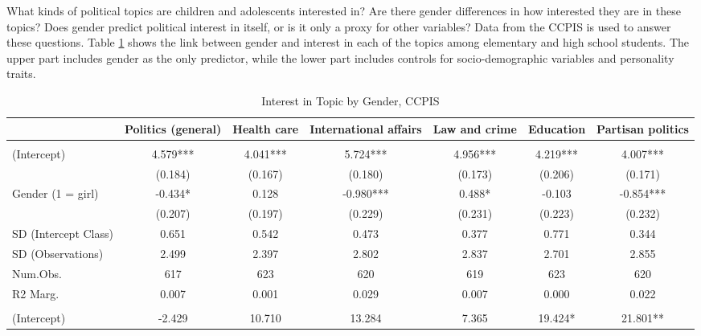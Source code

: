 \documentclass[
  letterpaper,
  DIV=11,
  numbers=noendperiod]{scrreprt}
\begin{document}
What kinds of political topics are children and adolescents interested
in? Are there gender differences in how interested they are in these
topics? Does gender predict political interest in itself, or is it only
a proxy for other variables? Data from the CCPIS is used to answer these
questions. Table \ref{tab:lmeInterestCCPIS} shows the link between
gender and interest in each of the topics among elementary and high
school students. The upper part includes gender as the only predictor,
while the lower part includes controls for socio-demographic variables
and personality traits.

\begin{table}
\centering\centering
\caption{Interest in Topic by Gender, CCPIS \label{tab:lmeInterestCCPIS}}
\centering
\fontsize{6}{8}\selectfont
\begin{tabular}[t]{lcccccc}
\toprule
  & Politics (general) & Health care & International affairs & Law and crime & Education & Partisan politics\\
\midrule
\addlinespace[0.5em]
\multicolumn{7}{l}{\textit{Without Controls}}\\
\midrule \hspace{1em}(Intercept) & 4.579*** & 4.041*** & 5.724*** & 4.956*** & 4.219*** & 4.007***\\
\hspace{1em} & (0.184) & (0.167) & (0.180) & (0.173) & (0.206) & (0.171)\\
\hspace{1em}Gender (1 = girl) & -0.434* & 0.128 & -0.980*** & 0.488* & -0.103 & -0.854***\\
\hspace{1em} & (0.207) & (0.197) & (0.229) & (0.231) & (0.223) & (0.232)\\
\hspace{1em}SD (Intercept Class) & 0.651 & 0.542 & 0.473 & 0.377 & 0.771 & 0.344\\
\hspace{1em}SD (Observations) & 2.499 & 2.397 & 2.802 & 2.837 & 2.701 & 2.855\\
\hspace{1em}Num.Obs. & 617 & 623 & 620 & 619 & 623 & 620\\
\hspace{1em}R2 Marg. & 0.007 & 0.001 & 0.029 & 0.007 & 0.000 & 0.022\\
\addlinespace[0.5em]
\multicolumn{7}{l}{\textit{With Controls}}\\
\midrule \hspace{1em}(Intercept) & -2.429 & 10.710 & 13.284 & 7.365 & 19.424* & 21.801**\\

\end{tabular}
\end{table}
\end{document}
